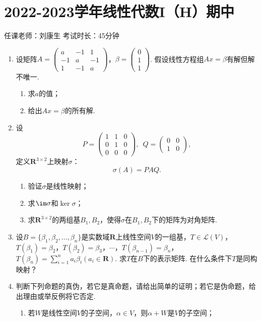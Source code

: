 \section{2022-2023学年线性代数I（H）期中}

\begin{center}
    任课老师：刘康生\hspace{4em} 考试时长：45分钟
\end{center}
\begin{enumerate}
    \item  设矩阵$A=\begin{pmatrix}
        a & -1 & 1 \\ -1 & a & -1 \\ 1 & -1 & a
    \end{pmatrix}$，$\beta=\begin{pmatrix}
        0 \\ 1 \\ 1
    \end{pmatrix}$. 假设线性方程组$Ax=\beta$有解但解不唯一.
    \begin{enumerate}
        \item 求$a$的值；

        \item 给出$Ax=\beta$的所有解.
    \end{enumerate}
	\item 设
	\[P=\begin{pmatrix}
        1 & 1 & 0 \\ 0 & 1 & 0 \\ 0 & 0 & 0
    \end{pmatrix},\enspace Q=\begin{pmatrix}
        0 & 0 \\ 1 & 0
    \end{pmatrix},\]
    定义$\mathbf{R}^{3\times 2}$上映射$\sigma$：
    \[\sigma(A)=PAQ.\]
    \begin{enumerate}
        \item 验证$\sigma$是线性映射；

        \item 求$\im\sigma$和$\ker\sigma$；

        \item 求$\mathbf{R}^{3\times 2}$的两组基$B_1,B_2$，使得$\sigma$在$B_1,B_2$下的矩阵为对角矩阵.
    \end{enumerate}
	\item 设$B=\{\beta_1,\beta_2,\ldots,\beta_n\}$是实数域$\mathbf{R}$上线性空间$V$的一组基，$T\in\mathcal{L}(V)$，$T(\beta_1)=\beta_2$，$T(\beta_2)=\beta_3$，$\cdots$，$T(\beta_{n-1})=\beta_n$，$T(\beta_n)=\sum\limits_{i=1}^{n}a_i\beta_i(a_i\in\mathbf{R})$. 求$T$在$B$下的表示矩阵. 在什么条件下$T$是同构映射？
	\item 判断下列命题的真伪，若它是真命题，请给出简单的证明；若它是伪命题，给出理由或举反例将它否定.
	\begin{enumerate}
        \item 若$W$是线性空间$V$的子空间，$\alpha\in V$，则$\alpha+W$是$V$的子空间；


\end{enumerate}
\end{enumerate}
